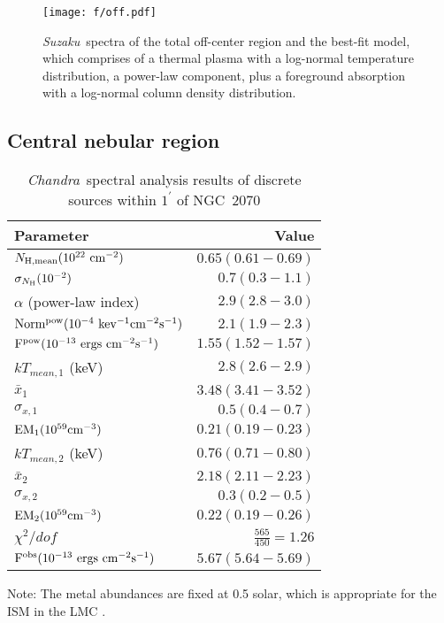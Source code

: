 \documentclass[usenatbib]{mnras}
\def\suzaku{{\sl Suzaku}}
\def\chandra{{\sl Chandra}}
\begin{document}


\begin{figure}
\texttt{[image: f/off.pdf]}
\caption{\suzaku\  spectra of the total off-center region and the best-fit model, which comprises of a thermal plasma with a log-normal temperature distribution, a power-law component, plus a foreground absorption with a log-normal column density distribution.}
\label{f:spec_off}
\end{figure}

\subsection{Central nebular region}
\label{ss:central}

\begin{table}
\caption{\chandra\ spectral analysis results of discrete sources within $1^{\prime}$ of NGC~2070}\label{t:spec_chandra}
\begin{tabular}{lr}
\hline
Parameter & Value \\
\hline
$N_{\rm H, mean} (10^{22} {\rm~cm^{-2}})$ &$0.65(0.61-0.69)$\\
$\sigma_{N_{\rm H}} (10^{-2})$ & $0.7(0.3-1.1)$ \\
$\alpha$ (power-law index) &$2.9(2.8-3.0)$\\
$\rm{Norm^{pow}} (10^{-4} {\rm~kev^{-1}cm^{-2}s^{-1}})$ &$2.1(1.9-2.3)$\\
$\rm{F^{pow}} (10^{-13}~ergs~cm^{-2}s^{-1})$ &$1.55(1.52-1.57)$\\
$kT_{mean,1}$  (keV) &$2.8(2.6-2.9)$\\
$\bar{x}_1\ $ &$3.48(3.41-3.52)$ \\
$\sigma_{x,1}$ & $0.5(0.4-0.7)$ \\
$\rm{EM_1} (10^{59}cm^{-3})$ &$0.21(0.19-0.23)$\\
$kT_{mean,2}$ (keV) &$0.76(0.71-0.80)$\\
$\bar{x}_2\ $ &$2.18(2.11-2.23)$ \\
$\sigma_{x,2}$ & $0.3(0.2-0.5)$ \\
$\rm{EM_2} (10^{59}cm^{-3})$ &$0.22(0.19-0.26)$\\
$\chi^2/dof$ &$\frac{565}{450}=1.26$ \\
$\rm{F^{obs}} (10^{-13}~ergs~cm^{-2}s^{-1})$ &$5.67(5.64-5.69)$ \\
\hline
\end{tabular}

Note: The metal abundances are fixed at 0.5 solar, which is appropriate for the ISM in the LMC \citep{Russell}.
\end{table}
\end{document}
